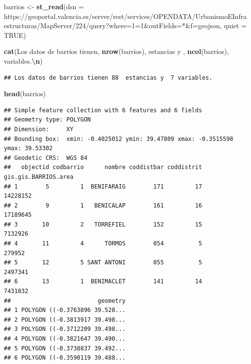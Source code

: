 \documentclass[notspecified,article,submit,moreauthors,pdftex]{Definitions/mdpi}
\newenvironment{Shaded}{\begin{snugshade}}{\end{snugshade}}
\newcommand{\AttributeTok}[1]{\textcolor[rgb]{0.13,0.29,0.53}{#1}}
\newcommand{\ConstantTok}[1]{\textcolor[rgb]{0.56,0.35,0.01}{#1}}
\newcommand{\FunctionTok}[1]{\textcolor[rgb]{0.13,0.29,0.53}{\textbf{#1}}}
\newcommand{\NormalTok}[1]{#1}
\newcommand{\OtherTok}[1]{\textcolor[rgb]{0.56,0.35,0.01}{#1}}
\newcommand{\SpecialCharTok}[1]{\textcolor[rgb]{0.81,0.36,0.00}{\textbf{#1}}}
\newcommand{\StringTok}[1]{\textcolor[rgb]{0.31,0.60,0.02}{#1}}
\begin{document}
\begin{Shaded}
\begin{Highlighting}[]
\NormalTok{barrios }\OtherTok{\textless{}{-}} \FunctionTok{st\_read}\NormalTok{(}\AttributeTok{dsn =} \StringTok{\textquotesingle{}https://geoportal.valencia.es/server/rest/services/OPENDATA/UrbanismoEInfraestructuras/MapServer/224/query?where=1=1\&outFields=*\&f=geojson\textquotesingle{}}\NormalTok{, }\AttributeTok{quiet =} \ConstantTok{TRUE}\NormalTok{)}

\FunctionTok{cat}\NormalTok{(}\StringTok{\textquotesingle{}Los datos de barrios tienen\textquotesingle{}}\NormalTok{, }\FunctionTok{nrow}\NormalTok{(barrios), }\StringTok{\textquotesingle{} estancias y \textquotesingle{}}\NormalTok{, }\FunctionTok{ncol}\NormalTok{(barrios), }\StringTok{\textquotesingle{}variables.}\SpecialCharTok{\textbackslash{}n}\StringTok{\textquotesingle{}}\NormalTok{)}
\end{Highlighting}
\end{Shaded}

\begin{verbatim}
## Los datos de barrios tienen 88  estancias y  7 variables.
\end{verbatim}

\begin{Shaded}
\begin{Highlighting}[]
\FunctionTok{head}\NormalTok{(barrios)}
\end{Highlighting}
\end{Shaded}

\begin{verbatim}
## Simple feature collection with 6 features and 6 fields
## Geometry type: POLYGON
## Dimension:     XY
## Bounding box:  xmin: -0.4025012 ymin: 39.47809 xmax: -0.3515598 ymax: 39.53302
## Geodetic CRS:  WGS 84
##   objectid codbarrio      nombre coddistbar coddistrit gis.gis.BARRIOS.area
## 1        5         1  BENIFARAIG        171         17             14228152
## 2        9         1   BENICALAP        161         16             17189645
## 3       10         2   TORREFIEL        152         15              7132926
## 4       11         4      TORMOS        054          5               279952
## 5       12         5 SANT ANTONI        055          5              2497341
## 6       13         1  BENIMACLET        141         14              7431832
##                         geometry
## 1 POLYGON ((-0.3763896 39.528...
## 2 POLYGON ((-0.3813917 39.498...
## 3 POLYGON ((-0.3712209 39.498...
## 4 POLYGON ((-0.3821647 39.490...
## 5 POLYGON ((-0.3738837 39.492...
## 6 POLYGON ((-0.3590119 39.488...
\end{verbatim}
\end{document}
